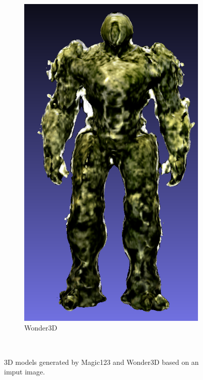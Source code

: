 \begin{figure}[H]
\begin{subfigure}[b]{0.21\textwidth}
        \includegraphics[width=\textwidth]{figures/generationProcess/wonder3d_plantrobot_model_resized.png}
        \caption{Wonder3D}
    \end{subfigure}
    \caption{3D models generated by Magic123 and Wonder3D based on an imput image.}~\label{fig:inputAndModel}
  \end{figure}